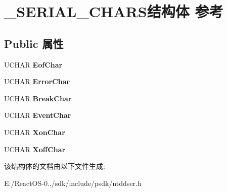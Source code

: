 \hypertarget{struct___s_e_r_i_a_l___c_h_a_r_s}{}\section{\+\_\+\+S\+E\+R\+I\+A\+L\+\_\+\+C\+H\+A\+R\+S结构体 参考}
\label{struct___s_e_r_i_a_l___c_h_a_r_s}
\subsection*{Public 属性}
\begin{DoxyCompactItemize}
\item 
\mbox{\label{struct___s_e_r_i_a_l___c_h_a_r_s_a84c65dae577740983dd25c55810ed88a}} 
U\+C\+H\+AR {\bfseries Eof\+Char}
\item 
\mbox{\label{struct___s_e_r_i_a_l___c_h_a_r_s_a53cefbd8df91b157067bb8b21d76e7e8}} 
U\+C\+H\+AR {\bfseries Error\+Char}
\item 
\mbox{\label{struct___s_e_r_i_a_l___c_h_a_r_s_ae084285ece055228b5ab5520b89b07e9}} 
U\+C\+H\+AR {\bfseries Break\+Char}
\item 
\mbox{\label{struct___s_e_r_i_a_l___c_h_a_r_s_a3ed212319491d96e2c438b3fabd41715}} 
U\+C\+H\+AR {\bfseries Event\+Char}
\item 
\mbox{\label{struct___s_e_r_i_a_l___c_h_a_r_s_a9c09c5a1f55a5e545d90aa77fdaa7102}} 
U\+C\+H\+AR {\bfseries Xon\+Char}
\item 
\mbox{\label{struct___s_e_r_i_a_l___c_h_a_r_s_a19b7aacfd92a47e528f5eecb968c168e}} 
U\+C\+H\+AR {\bfseries Xoff\+Char}
\end{DoxyCompactItemize}


该结构体的文档由以下文件生成\+:\begin{DoxyCompactItemize}
\item 
E\+:/\+React\+O\+S-\/0../sdk/include/psdk/ntddser.\+h\end{DoxyCompactItemize}
